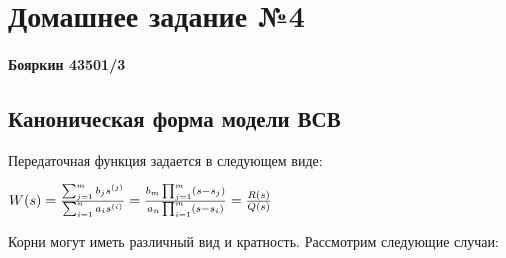 \documentclass[14pt,a4paper,report]{report}
\begin{document}
\chapter{Домашнее задание №4}

\subsubsection{Бояркин 43501/3}

\section{Каноническая форма модели ВСВ}
Передаточная функция задается в следующем виде:

$
W(s)=\frac{\sum_{j=1}^{m}b_js^{(j)}}{\sum_{i=1}^{n}a_is^{(i)}}=\frac{b_m\prod_{j=1}^{m}(s-s_j)}{a_n\prod_{i=1}^{m}(s-s_i)}=\frac{R(s)}{Q(s)}\\
$

Корни могут иметь различный вид и кратность. Рассмотрим следующие случаи:
\end{document}
